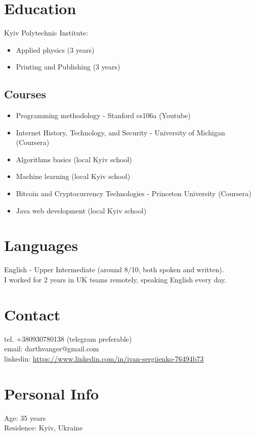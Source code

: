 \documentclass[a4paper, 14pt]{article}
\begin{document}
\section{Education}
  Kyiv Polytechnic Institute: 
  \begin{itemize}
    \item Applied physics (3 years) \\
    \item Printing and Publishing (3 years)
  \end{itemize}

  \subsection{Courses}
  \begin{itemize}
    \item Programming methodology - Stanford cs106a (Youtube) \\
    \item Internet History, Technology, and Security - University of Michigan (Coursera) \\
    \item Algorithms basics (local Kyiv school) \\
    \item Machine learning (local Kyiv school) \\
    \item Bitcoin and Cryptocurrency Technologies - Princeton University (Coursera) \\
    \item Java web development (local Kyiv school)
  \end{itemize}

\section{Languages}
	English - Upper Intermediate (around 8/10, both spoken and written). \\
  I worked for 2 years in UK teams remotely, speaking English every day.

\section{Contact}
	tel. +380930780138 (telegram preferable) \\
	email: darthvanger@gmail.com \\
  linkedin: \url{https://www.linkedin.com/in/ivan-sergiienko-76494b73}

\section{Personal Info}
	Age: 35 years \\
  Residence: Kyiv, Ukraine
\end{document}

